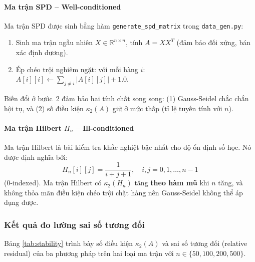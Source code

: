 \paragraph{Ma trận SPD -- Well-conditioned}

Ma trận SPD được sinh bằng hàm \texttt{generate\_spd\_matrix} trong \texttt{data\_gen.py}:
\begin{enumerate}
    \item Sinh ma trận ngẫu nhiên $X \in \mathbb{R}^{n \times n}$, tính $A = X X^T$ (đảm bảo đối xứng, bán xác định dương).
    \item Ép chéo trội nghiêm ngặt: với mỗi hàng $i$: $A[i][i] \leftarrow \sum_{j \neq i} |A[i][j]| + 1.0$.
\end{enumerate}
Biến đổi ở bước~2 đảm bảo hai tính chất song song: (1) Gauss-Seidel chắc chắn hội tụ, và (2) số điều kiện $\kappa_2(A)$ giữ ở mức thấp (tỉ lệ tuyến tính với $n$).

\paragraph{Ma trận Hilbert $H_n$ -- Ill-conditioned}

Ma trận Hilbert là bài kiểm tra khắc nghiệt bậc nhất cho độ ổn định số học. Nó được định nghĩa bởi:
\begin{equation}
    H_n[i][j] = \frac{1}{i + j + 1}, \quad i, j = 0, 1, \ldots, n-1
\end{equation}
(0-indexed). Ma trận Hilbert có $\kappa_2(H_n)$ tăng \textbf{theo hàm mũ} khi $n$ tăng, và không thỏa mãn điều kiện chéo trội chặt hàng nên Gauss-Seidel không thể áp dụng được.

\subsubsection{Kết quả đo lường sai số tương đối}

Bảng \ref{tab:stability} trình bày số điều kiện $\kappa_2(A)$ và sai số tương đối (relative residual) của ba phương pháp trên hai loại ma trận với $n \in \{50, 100, 200, 500\}$.


